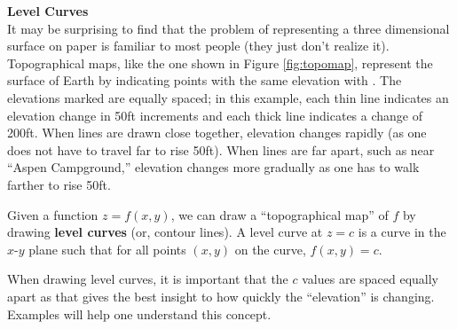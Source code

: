 \noindent\textbf{\large Level Curves}\\

It may be surprising to find that the problem of representing a three dimensional surface on paper is familiar to most people (they just don't realize it). Topographical maps, like the one shown in Figure \ref{fig:topomap}, represent the surface of Earth by indicating points with the same elevation with . The elevations marked are equally spaced; in this example, each thin line indicates an elevation change in 50ft increments and each thick line indicates a change of 200ft. When lines are drawn close together, elevation changes rapidly (as one does not have to travel far to rise 50ft). When lines are far apart, such as near ``Aspen Campground,'' elevation changes more gradually as one has to walk farther to rise 50ft.


Given a function $z=f(x,y)$, we can draw a ``topographical map'' of $f$ by drawing \textbf{level curves} (or, contour lines). A level curve at $z=c$ is a curve in the $x$-$y$ plane such that for all points $(x,y)$ on the curve, $f(x,y) = c$. 

When drawing level curves, it is important that the $c$ values are spaced equally apart as that gives the best insight to how quickly the ``elevation'' is changing. Examples will help one understand this concept.\\

